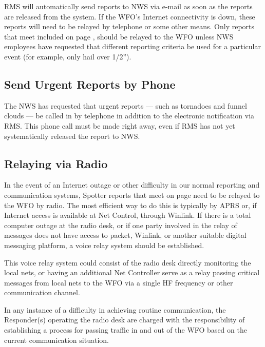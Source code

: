 \documentclass[pdflatex,letterpaper,twoside,12pt]{book}
\begin{document}
RMS will automatically send reports to NWS via e-mail as soon as the reports are released from the system.  If the WFO's Internet connectivity is down, these reports will need to be relayed by telephone or some other means.  Only reports that meet  included on page \pageref{reporting-criteria}, should be relayed to the WFO unless NWS employees have requested that different reporting criteria be used for a particular event (for example, only hail over 1/2'').

\subsection{Send Urgent Reports by Phone}

The NWS has requested that urgent reports –-- such as tornadoes and funnel clouds –-- be called in by telephone in addition to the electronic notification via RMS.  This phone call must be made right away, even if RMS has not yet systematically released the report to NWS.

\subsection{Relaying via Radio}

In the event of an Internet outage or other difficulty in our normal reporting and communication systems, Spotter reports that meet  on page \pageref{reporting-criteria} need to be relayed to the WFO by radio.  The most efficient way to do this is typically by APRS or, if Internet access is available at Net Control, through Winlink.  If there is a total computer outage at the radio desk, or if one party involved in the relay of messages does not have access to packet, Winlink, or another suitable digital messaging platform, a voice relay system should be established.

This voice relay system could consist of the radio desk directly monitoring the local nets, or having an additional Net Controller serve as a relay passing critical messages from local nets to the WFO via a single HF frequency or other communication channel.

In any instance of a difficulty in achieving routine communication, the Responder(s) operating the radio desk are charged with the responsibility of establishing a process for passing traffic in and out of the WFO based on the current communication situation.

\end{document}
